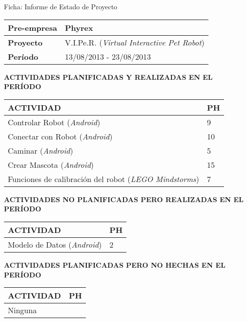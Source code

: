 \documentclass[10pt,letter]{article}
\begin{document}
\vspace{4cm}
\begin{center}
  {\huge Ficha: Informe de Estado de Proyecto}
\end{center}

\vspace{-0,2cm}
\begin{table}[H]
\centering
  \begin{tabular}{|p{3cm}|p{12cm}|}\hline
    {\bf Pre-empresa} & Phyrex \\ \hline
    {\bf Proyecto} & V.I.Pe.R. (\emph{Virtual Interactive Pet Robot}) \\ \hline
    {\bf Per\'iodo} & 13/08/2013 - 23/08/2013 \\\hline
  \end{tabular}
\end{table}

\vspace{0,5cm}
{\bf ACTIVIDADES PLANIFICADAS Y REALIZADAS EN EL PER\'IODO}
\begin{table}[H]
\centering
  \begin{tabular}{|p{12cm}|p{3cm}|}\hline
    {\bf ACTIVIDAD} & {\bf PH} \\ \hline
    Controlar Robot (\emph{Android})    & 9 \\\hline
    Conectar con Robot (\emph{Android}) & 10 \\\hline
    Caminar (\emph{Android})            & 5\\\hline
    Crear Mascota (\emph{Android})      & 15\\\hline
    Funciones de calibraci\'on del robot (\emph{LEGO Mindstorms}) & 7 \\ \hline
  \end{tabular}
\end{table}

\vspace{0,5cm}
{\bf ACTIVIDADES NO PLANIFICADAS PERO REALIZADAS EN EL PER\'IODO}
\begin{table}[H]
\centering
  \begin{tabular}{|p{12cm}|p{3cm}|}\hline
    {\bf ACTIVIDAD} & {\bf PH} \\ \hline
    Modelo de Datos (\emph{Android}) & 2 \\\hline
  \end{tabular}
\end{table}

\vspace{0,5cm}
{\bf ACTIVIDADES PLANIFICADAS PERO NO HECHAS EN EL PER\'IODO}
\begin{table}[H]
\centering
  \begin{tabular}{|p{12cm}|p{3cm}|}\hline
    {\bf ACTIVIDAD} & {\bf PH} \\ \hline
    Ninguna & \\\hline
  \end{tabular}
\end{table}
\end{document}
